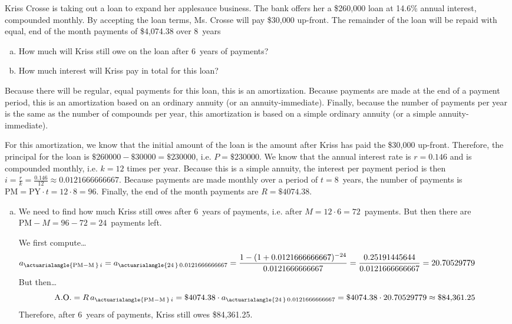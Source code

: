 \documentclass[12pt,letterpaper]{exam}
\begin{document}
\begin{questions}
\newpage
\question[15] Kriss Crosse is taking out a loan to expand her applesauce business. The bank offers her a \$260,000 loan at 14.6\% annual interest, compounded monthly. By accepting the loan terms, Ms. Crosse will pay \$30,000 up-front. The remainder of the loan will be repaid with equal, end of the month payments of \$4,074.38 over 8~years
	\begin{enumerate}[(a)]
	\item How much will Kriss still owe on the loan after 6~years of payments?
	\item How much interest will Kriss pay in total for this loan?
	\end{enumerate} \pspace

\sol Because there will be regular, equal payments for this loan, this is an amortization. Because payments are made at the end of a payment period, this is an amortization based on an ordinary annuity (or an annuity-immediate). Finally, because the number of payments per year is the same as the number of compounds per year, this amortization is based on a simple ordinary annuity (or a simple annuity-immediate). \pspace

For this amortization, we know that the initial amount of the loan is the amount after Kriss has paid the \$30,000 up-front. Therefore, the principal for the loan is $\$260000 - \$30000= \$230000$, i.e. $P= \$230000$. We know that the annual interest rate is $r= 0.146$ and is compounded monthly, i.e. $k= 12$ times per year. Because this is a simple annuity, the interest per payment period is then $i= \frac{r}{k}= \frac{0.146}{12} \approx 0.0121666666667$. Because payments are made monthly over a period of $t= 8$~years, the number of payments is $\text{PM}= \text{PY} \cdot t= 12 \cdot 8= 96$. Finally, the end of the month payments are $R= \$4074.38$. \pspace

\begin{enumerate}[(a)]
\item We need to find how much Kriss still owes after 6~years of payments, i.e. after $M= 12 \cdot 6= 72$~payments. But then there are $\text{PM} - M= 96 - 72= 24$~payments left. 

We first compute\dots
	\[
	\hspace{-1.5cm} a_{\actuarialangle{\text{PM} - \text{M}\,}\, i}= a_{\actuarialangle{24\,}\, 0.0121666666667}= \dfrac{1 - (1 + 0.0121666666667)^{-24}}{0.0121666666667}= \dfrac{0.25191445644}{0.0121666666667}= 20.70529779
	\]
But then\dots
	\[
	\text{A.O.}= R\, a_{\actuarialangle{\text{PM} - \text{M}\,}\, i}= \$4074.38 \cdot a_{\actuarialangle{24\,}\, 0.0121666666667}= \$4074.38 \cdot 20.70529779 \approx \$84,\!361.25
	\]
Therefore, after 6~years of payments, Kriss still owes \$84,361.25. \pspace


\end{enumerate}
\end{questions}
\end{document}
